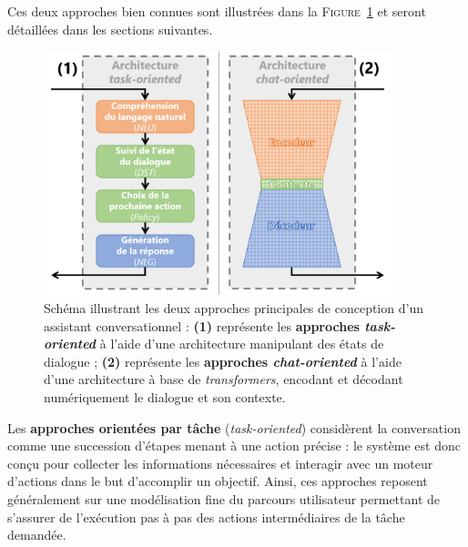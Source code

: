 		Ces deux approches bien connues sont illustrées dans la \textsc{Figure~\ref{figure:B.2-ANNEXE-CHATBOT-APPROCHES}} et seront détaillées dans les sections suivantes.
		\begin{figure}[H]
			\centering
			\includegraphics[width=0.90\textwidth]{figures/annexe-chatbots-architectures}
			\caption{
				Schéma illustrant les deux approches principales de conception d'un assistant conversationnel :
				\textbf{(1)} représente les \textbf{approches \textit{task-oriented}} à l'aide d'une architecture manipulant des états de dialogue ;
				\textbf{(2)} représente les \textbf{approches \textit{chat-oriented}} à l'aide d'une architecture à base de \textit{transformers}, encodant et décodant numériquement le dialogue et son contexte.
			}
			\label{figure:B.2-ANNEXE-CHATBOT-APPROCHES}
		\end{figure}
		
		
		
		Les \textbf{approches orientées par tâche} (\textit{task-oriented}) considèrent la conversation comme une succession d'étapes menant à une action précise : le système est donc conçu pour collecter les informations nécessaires et interagir avec un moteur d'actions dans le but d'accomplir un objectif.
		Ainsi, ces approches reposent généralement sur une modélisation fine du parcours utilisateur permettant de s'assurer de l'exécution pas à pas des actions intermédiaires de la tâche demandée.
		
